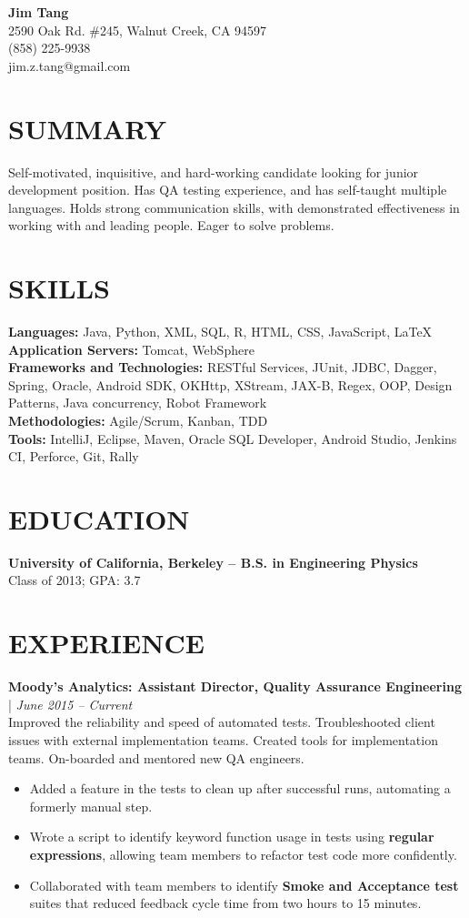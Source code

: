 \documentclass[9pt]{article}
\makeatletter
\newcommand{\myname}{Jim Tang}
\newcommand{\myaddress}{2590 Oak Rd. \#245, Walnut Creek, CA 94597}
\newcommand{\myphone}{(858) 225-9938}
\newcommand{\myemail}{jim.z.tang@gmail.com}
\newcommand{\resumeHeader}{\begin{center}
	{\LARGE \textbf{\myname}} 
	\vspace{3pt} \\
	\myaddress \\ \myphone \\ \myemail
	\end{center}}
\newcommand{\jobPosition}[1]{\vspace{2pt} #1}
\newcommand{\jobSummary}[1]{\vspace{2pt} \\ #1}
\newenvironment{jobHighlights}
	{\vspace{2pt}\begin{itemize}[noitemsep,nolistsep]}{\end{itemize} \vspace{6pt}}
\makeatother
\begin{document}
\resumeHeader

\section*{SUMMARY}
Self-motivated, inquisitive, and hard-working candidate looking for junior development position. Has QA testing experience, and has self-taught multiple languages. Holds strong communication skills, with demonstrated effectiveness in working with and leading people. Eager to solve problems.
	

\section*{SKILLS}
\textbf{Languages:} Java, Python, XML, SQL, R, HTML, CSS, JavaScript, \LaTeX
\\ \textbf{Application Servers:} Tomcat, WebSphere
\\ \textbf{Frameworks and Technologies:} RESTful Services, JUnit, JDBC, Dagger, Spring, Oracle, Android SDK, OKHttp, XStream, JAX-B, Regex, OOP, Design Patterns, Java concurrency, Robot Framework
\\ \textbf{Methodologies:} Agile/Scrum, Kanban, TDD
\\ \textbf{Tools:} IntelliJ, Eclipse, Maven, Oracle SQL Developer, Android Studio, Jenkins CI, Perforce, Git, Rally

\section*{EDUCATION}
\textbf{University of California, Berkeley -- B.S. in Engineering Physics}
\\ Class of 2013; GPA: 3.7

\section*{EXPERIENCE}

\jobPosition{\textbf{Moody's Analytics: Assistant Director, Quality Assurance Engineering} | \textit{June 2015 -- Current}}
\jobSummary{Improved the reliability and speed of automated tests. Troubleshooted client issues with external implementation teams. Created tools for implementation teams. On-boarded and mentored new QA engineers.}
\begin{jobHighlights}
	\item Added a feature in the tests to clean up after successful runs, automating a formerly manual step.
	\item Wrote a script to identify keyword function usage in tests using \textbf{regular expressions}, allowing team members to refactor test code more confidently.
	\item Collaborated with team members to identify \textbf{Smoke and Acceptance test} suites that reduced feedback cycle time from two hours to 15 minutes.
\end{jobHighlights}
\end{document}
